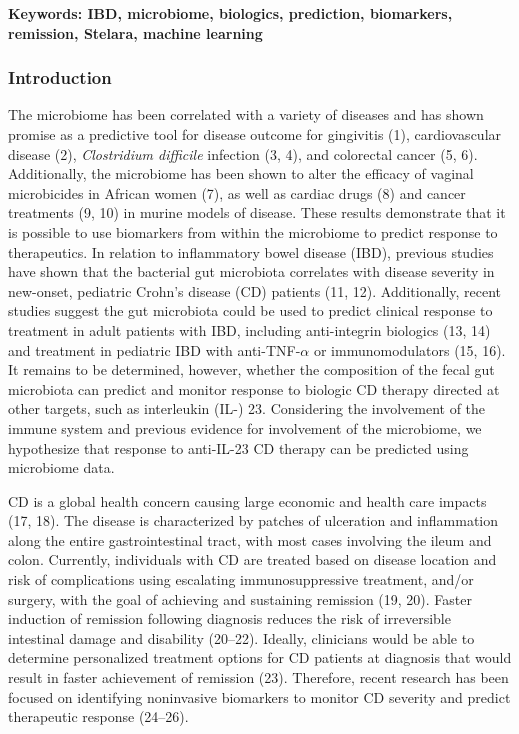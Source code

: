 \documentclass[12pt,]{article}
\begin{document}
\textbf{Keywords: IBD, microbiome, biologics, prediction, biomarkers,
remission, Stelara, machine learning}

\newpage

\subsubsection{Introduction}\label{introduction}

The microbiome has been correlated with a variety of diseases and has
shown promise as a predictive tool for disease outcome for gingivitis
(1), cardiovascular disease (2), \emph{Clostridium difficile} infection
(3, 4), and colorectal cancer (5, 6). Additionally, the microbiome has
been shown to alter the efficacy of vaginal microbicides in African
women (7), as well as cardiac drugs (8) and cancer treatments (9, 10) in
murine models of disease. These results demonstrate that it is possible
to use biomarkers from within the microbiome to predict response to
therapeutics. In relation to inflammatory bowel disease (IBD), previous
studies have shown that the bacterial gut microbiota correlates with
disease severity in new-onset, pediatric Crohn's disease (CD) patients
(11, 12). Additionally, recent studies suggest the gut microbiota could
be used to predict clinical response to treatment in adult patients with
IBD, including anti-integrin biologics (13, 14) and treatment in
pediatric IBD with anti-TNF-\({\alpha}\) or immunomodulators (15, 16).
It remains to be determined, however, whether the composition of the
fecal gut microbiota can predict and monitor response to biologic CD
therapy directed at other targets, such as interleukin (IL-) 23.
Considering the involvement of the immune system and previous evidence
for involvement of the microbiome, we hypothesize that response to
anti-IL-23 CD therapy can be predicted using microbiome data.

CD is a global health concern causing large economic and health care
impacts (17, 18). The disease is characterized by patches of ulceration
and inflammation along the entire gastrointestinal tract, with most
cases involving the ileum and colon. Currently, individuals with CD are
treated based on disease location and risk of complications using
escalating immunosuppressive treatment, and/or surgery, with the goal of
achieving and sustaining remission (19, 20). Faster induction of
remission following diagnosis reduces the risk of irreversible
intestinal damage and disability (20--22). Ideally, clinicians would be
able to determine personalized treatment options for CD patients at
diagnosis that would result in faster achievement of remission (23).
Therefore, recent research has been focused on identifying noninvasive
biomarkers to monitor CD severity and predict therapeutic response
(24--26).
\end{document}

